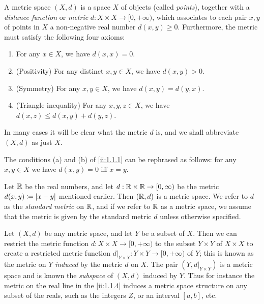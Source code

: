 \begin{defn}\label{ii:1.1.2}
  A metric space \((X, d)\) is a space \(X\) of objects (called \emph{points}), together with a \emph{distance function} or \emph{metric} \(d : X \times X \to [0, +\infty)\), which associates to each pair \(x, y\) of points in \(X\) a non-negative real number \(d(x, y) \geq 0\).
  Furthermore, the metric must satisfy the following four axioms:
  \begin{enumerate}
    \item For any \(x \in X\), we have \(d(x, x) = 0\).
    \item (Positivity) For any distinct \(x, y \in X\), we have \(d(x, y) > 0\).
    \item (Symmetry) For any \(x, y \in X\), we have \(d(x, y) = d(y, x)\).
    \item (Triangle inequality) For any \(x, y, z \in X\), we have \(d(x, z) \leq d(x, y) + d(y, z)\).
  \end{enumerate}
\end{defn}

\begin{note}
  In many cases it will be clear what the metric \(d\) is, and we shall abbreviate \((X, d)\) as just \(X\).
\end{note}

\begin{rmk}\label{ii:1.1.3}
  The conditions (a) and (b) of \cref{ii:1.1.1} can be rephrased as follows:
  for any \(x, y \in X\) we have \(d(x, y) = 0\) iff \(x = y\).
\end{rmk}

\begin{eg}\label{ii:1.1.4}
  Let \(\mathbb{R}\) be the real numbers, and let \(d : \mathbb{R} \times \mathbb{R} \to [0, \infty)\) be the metric \(d(x, y) \coloneqq \left\lvert x - y\right\rvert\) mentioned earlier.
  Then \((\mathbb{R}, d)\) is a metric space.
  We refer to \(d\) as the \emph{standard metric} on \(\mathbb{R}\), and if we refer to \(\mathbb{R}\) as a metric space, we assume that the metric is given by the standard metric \(d\) unless otherwise specified.
\end{eg}

\begin{eg}\label{ii:1.1.5}
  Let \((X, d)\) be any metric space, and let \(Y\) be a subset of \(X\).
  Then we can restrict the metric function \(d : X \times X \to [0, +\infty)\) to the subset \(Y \times Y\) of \(X \times X\) to create a restricted metric function \(d|_{Y \times Y} : Y \times Y \to [0, +\infty)\) of \(Y\);
  this is known as the metric on \(Y\) \emph{induced} by the metric \(d\) on \(X\).
  The pair \((Y, d|_{Y \times Y})\) is a metric space and is known the \emph{subspace} of \((X, d)\) induced by \(Y\).
  Thus for instance the metric on the real line in the \cref{ii:1.1.4} induces a metric space structure on any subset of the reals, such as the integers \(Z\), or an interval \([a, b]\), etc.
\end{eg}

